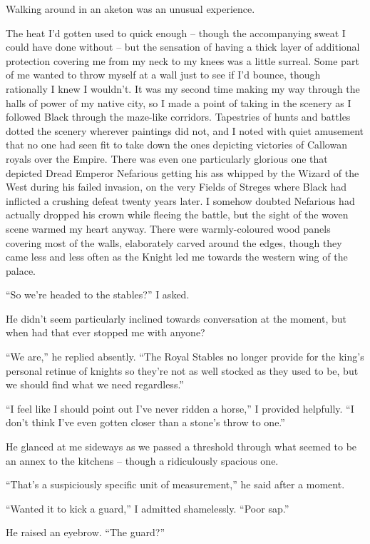 \documentclass[12pt, openany]{book}
\begin{document}
Walking around in an aketon was an unusual experience.

The heat I’d gotten used to quick enough – though the accompanying sweat I could have done without – but the sensation of having a thick layer of additional protection covering me from my neck to my knees was a little surreal. Some part of me wanted to throw myself at a wall just to see if I’d bounce, though rationally I knew I wouldn’t. It was my second time making my way through the halls of power of my native city, so I made a point of taking in the scenery as I followed Black through the maze-like corridors. Tapestries of hunts and battles dotted the scenery wherever paintings did not, and I noted with quiet amusement that no one had seen fit to take down the ones depicting victories of Callowan royals over the Empire. There was even one particularly glorious one that depicted Dread Emperor Nefarious getting his ass whipped by the Wizard of the West during his failed invasion, on the very Fields of Streges where Black had inflicted a crushing defeat twenty years later. I somehow doubted Nefarious had actually dropped his crown while fleeing the battle, but the sight of the woven scene warmed my heart anyway. There were warmly-coloured wood panels covering most of the walls, elaborately carved around the edges, though they came less and less often as the Knight led me towards the western wing of the palace.

“So we’re headed to the stables?” I asked.

He didn’t seem particularly inclined towards conversation at the moment, but when had that ever stopped me with anyone?

“We are,” he replied absently. “The Royal Stables no longer provide for the king’s personal retinue of knights so they’re not as well stocked as they used to be, but we should find what we need regardless.”

“I feel like I should point out I’ve never ridden a horse,” I provided helpfully. “I don’t think I’ve even gotten closer than a stone’s throw to one.”

He glanced at me sideways as we passed a threshold through what seemed to be an annex to the kitchens – though a ridiculously spacious one.

“That’s a suspiciously specific unit of measurement,” he said after a moment.

“Wanted it to kick a guard,” I admitted shamelessly. “Poor sap.”

He raised an eyebrow. “The guard?”
\end{document}
